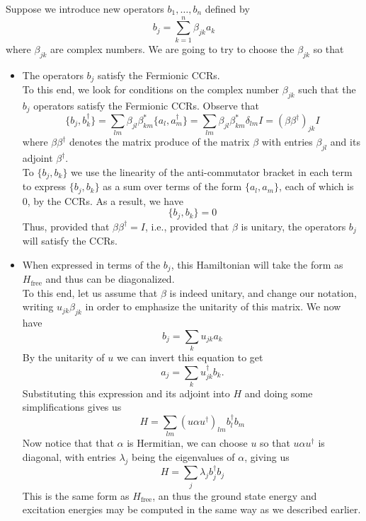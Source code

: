\documentclass{book}
\theoremstyle{definition}
\newcommand{\al}{\alpha}
\newcommand{\be}{\beta}
\begin{document}
Suppose we introduce new operators $b_1,\dots,b_n$ defined by 
\begin{equation}
\boxed{b_j  =\sum^n_{k=1} \beta_{jk}a_k}
\end{equation}
where $\be_{jk}$ are complex numbers. We are going to try to choose the $\be_{jk}$ so that 
\begin{itemize}
	\item The operators $b_j$ satisfy the Fermionic CCRs.\\
	
	To this end, we look for conditions on the complex number $\be_{jk}$ such that the $b_j$ operators satisfy the Fermionic CCRs. Observe that
	\begin{equation}
	\boxed{\{ b_j , b_k^\dagger \} = \sum_{lm} \be_{jl} \be^*_{km} \{a_l, a_m^\dagger \} = \sum_{lm} \be_{jl} \be^*_{km} \delta_{lm}I = (\be\be^\dagger)_{jk}I}
	\end{equation}
	where $\be\be^\dagger$ denotes the matrix produce of the matrix $\be$ with entries $\be_{jl}$ and its adjoint $\be^\dagger$.\\
	
	To  $\{ b_j ,b_k\}$ we use the linearity of the anti-commutator bracket in each term to express $\{ b_j ,b_k \}$ as a sum over terms of the form $\{ a_l,a_m \}$, each of which is 0, by the CCRs. As a result, we have
	\begin{equation}
	\boxed{ \{b_j ,b_k\} = 0}
	\end{equation} 
	Thus, provided that $\be\be^\dagger = I$, i.e., provided that $\be$ is unitary, the operators $b_j$ will satisfy the CCRs. 
	
	
	
	\item When expressed in terms of the $b_j$, this Hamiltonian will take the form as $H_\text{free}$ and thus can be diagonalized. \\
	
	To this end, let us assume that $\be$ is indeed unitary, and change our notation, writing $u_{jk} \beta_{jk}$ in order to emphasize the unitarity of this matrix. We now have 
	\begin{equation}
	b_j = \sum_k u_{jk}a_k
	\end{equation}
	By the unitarity of $u$ we can invert this equation to get
	\begin{equation}
	a_j = \sum_k u^\dagger_{jk} b_k.
	\end{equation}
	Substituting this expression and its adjoint into $H$ and doing some simplifications gives us 
	\begin{equation}
	H = \sum_{lm} (u\al u^\dagger)_{lm}b_l^\dagger b_m
	\end{equation}
	Now notice that that $\al$ is Hermitian, we can choose $u$ so that $u\al u^\dagger$ is diagonal, with entries $\lambda_j$ being the eigenvalues of $\al$, giving us 
	\begin{equation}
	\boxed{H = \sum_j \lambda_j b_j^\dagger b_j}
	\end{equation}
	This is the same form as $H_{\text{free}}$, an thus the ground state energy and excitation energies may be computed in the same way as we described earlier. 
\end{itemize}
\end{document}
